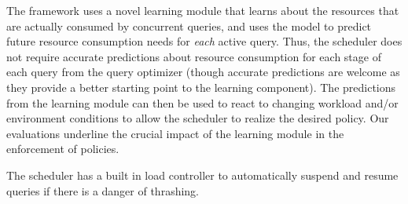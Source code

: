 The framework uses a novel learning module that learns about the resources that are actually consumed by concurrent queries, and uses the model to predict future resource consumption needs for \textit{each} active query. 
Thus, the scheduler does not require accurate predictions about resource consumption for each stage of each query from the query optimizer (though accurate predictions are welcome as they provide a better starting point to the learning component). 
The predictions from the learning module can then be used to react to changing workload and/or environment conditions to allow the scheduler to realize the desired policy. 
Our evaluations underline the crucial impact of the learning module in the enforcement of policies.

The scheduler has a built in load controller to automatically suspend and resume queries if there is a danger of thrashing.
%

